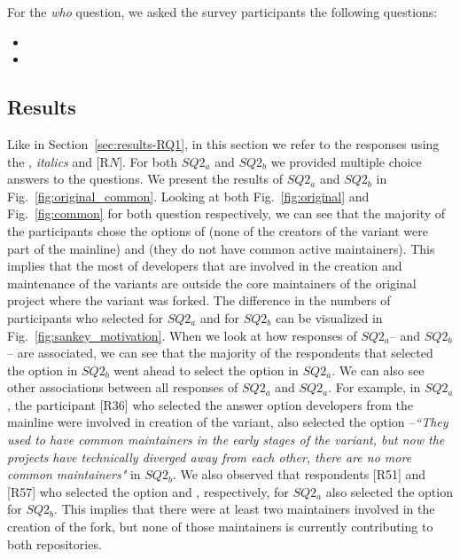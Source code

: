 For the \textit{who} question, we asked the survey participants the following questions:

\begin{itemize}
\item  \rqTwoOne
\item \rqTwoTwo
\end{itemize}

\subsection{Results}
Like in Section~\ref{sec:results-RQ1}, in this section we refer to the responses using the , \emph{italics} and [R$N$].
For both $SQ2_{a}$ and $SQ2_{b}$ we provided multiple choice answers to the questions. We present the results of $SQ2_{a}$ and $SQ2_{b}$ in Fig.~\ref{fig:original_common}. Looking at both Fig.~\ref{fig:original} and Fig.~\ref{fig:common} for both question respectively, we can see that the majority of the participants chose the options of  (none of the creators of the variant were part of the mainline) and  (they do not have common active maintainers).
This implies that the most of developers that are involved in the creation and maintenance of the variants are outside the core maintainers of the original project where the variant was forked.
The difference in the numbers of participants who selected   for $SQ2_{a}$ and  for $SQ2_{b}$ can be visualized in Fig.~\ref{fig:sankey_motivation}.
When we look at how responses of $SQ2_{a}$-- and $SQ2_{b}$-- are associated, we can see that the majority of the respondents that selected the option  in $SQ2_{b}$ went ahead to select the option  in $SQ2_{a}$. We can also see other associations between all responses of $SQ2_{a}$ and $SQ2_{a}$.
For example, in $SQ2_{a}$, the participant [R36] who selected the answer option  developers from the mainline were involved in creation of the variant, also selected the option --\emph{``They used to have common maintainers in the early stages of the variant, but now the projects have technically diverged away from each other, there are no more common maintainers"} in $SQ2_{b}$.
We also observed that respondents [R51] and [R57] who selected the option  and , respectively, for $SQ2_{a}$ also selected the option  for $SQ2_{b}$. This implies that there were at least two maintainers involved in the creation of the fork, but none of those maintainers is currently contributing to both repositories.



